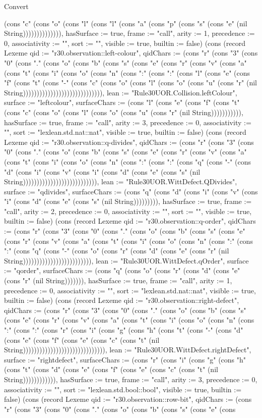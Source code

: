 \begin{lexlean}{Convert}
\begin{semanticmodule}
{(cons "c" (cons "o" (cons "l" (cons "l" (cons "a" (cons "p" (cons "s" (cons "e" (nil String)))))))))))))), hasSurface := true, frame := "call", arity := 1, precedence := 0, associativity := "", sort := "", visible := true, builtin := false}) (cons (record Lexeme {qid := "r30.observation::left-colour", qidChars := (cons "r" (cons "3" (cons "0" (cons "." (cons "o" (cons "b" (cons "s" (cons "e" (cons "r" (cons "v" (cons "a" (cons "t" (cons "i" (cons "o" (cons "n" (cons ":" (cons ":" (cons "l" (cons "e" (cons "f" (cons "t" (cons "-" (cons "c" (cons "o" (cons "l" (cons "o" (cons "u" (cons "r" (nil String))))))))))))))))))))))))))))), lean := "Rule30UOR.Collision.leftColour", surface := "leftcolour", surfaceChars := (cons "l" (cons "e" (cons "f" (cons "t" (cons "c" (cons "o" (cons "l" (cons "o" (cons "u" (cons "r" (nil String))))))))))), hasSurface := true, frame := "call", arity := 3, precedence := 0, associativity := "", sort := "lexlean.std.nat::nat", visible := true, builtin := false}) (cons (record Lexeme {qid := "r30.observation::q-divides", qidChars := (cons "r" (cons "3" (cons "0" (cons "." (cons "o" (cons "b" (cons "s" (cons "e" (cons "r" (cons "v" (cons "a" (cons "t" (cons "i" (cons "o" (cons "n" (cons ":" (cons ":" (cons "q" (cons "-" (cons "d" (cons "i" (cons "v" (cons "i" (cons "d" (cons "e" (cons "s" (nil String))))))))))))))))))))))))))), lean := "Rule30UOR.WittDefect.QDivides", surface := "qdivides", surfaceChars := (cons "q" (cons "d" (cons "i" (cons "v" (cons "i" (cons "d" (cons "e" (cons "s" (nil String))))))))), hasSurface := true, frame := "call", arity := 2, precedence := 0, associativity := "", sort := "", visible := true, builtin := false}) (cons (record Lexeme {qid := "r30.observation::q-order", qidChars := (cons "r" (cons "3" (cons "0" (cons "." (cons "o" (cons "b" (cons "s" (cons "e" (cons "r" (cons "v" (cons "a" (cons "t" (cons "i" (cons "o" (cons "n" (cons ":" (cons ":" (cons "q" (cons "-" (cons "o" (cons "r" (cons "d" (cons "e" (cons "r" (nil String))))))))))))))))))))))))), lean := "Rule30UOR.WittDefect.qOrder", surface := "qorder", surfaceChars := (cons "q" (cons "o" (cons "r" (cons "d" (cons "e" (cons "r" (nil String))))))), hasSurface := true, frame := "call", arity := 1, precedence := 0, associativity := "", sort := "lexlean.std.nat::nat", visible := true, builtin := false}) (cons (record Lexeme {qid := "r30.observation::right-defect", qidChars := (cons "r" (cons "3" (cons "0" (cons "." (cons "o" (cons "b" (cons "s" (cons "e" (cons "r" (cons "v" (cons "a" (cons "t" (cons "i" (cons "o" (cons "n" (cons ":" (cons ":" (cons "r" (cons "i" (cons "g" (cons "h" (cons "t" (cons "-" (cons "d" (cons "e" (cons "f" (cons "e" (cons "c" (cons "t" (nil String)))))))))))))))))))))))))))))), lean := "Rule30UOR.WittDefect.rightDefect", surface := "rightdefect", surfaceChars := (cons "r" (cons "i" (cons "g" (cons "h" (cons "t" (cons "d" (cons "e" (cons "f" (cons "e" (cons "c" (cons "t" (nil String)))))))))))), hasSurface := true, frame := "call", arity := 3, precedence := 0, associativity := "", sort := "lexlean.std.bool::bool", visible := true, builtin := false}) (cons (record Lexeme {qid := "r30.observation::row-bit", qidChars := (cons "r" (cons "3" (cons "0" (cons "." (cons "o" (cons "b" (cons "s" (cons "e" (cons }
\end{semanticmodule}
\end{lexlean}
